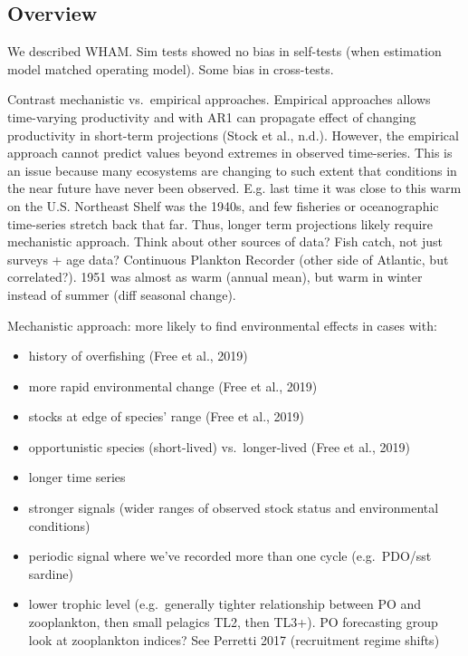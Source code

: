 \documentclass[]{article}
\providecommand{\tightlist}{%
  \setlength{\itemsep}{0pt}\setlength{\parskip}{0pt}}
\begin{document}
\hypertarget{overview}{%
\subsection{Overview}\label{overview}}

We described WHAM. Sim tests showed no bias in self-tests (when
estimation model matched operating model). Some bias in cross-tests.

Contrast mechanistic vs.~empirical approaches. Empirical approaches
allows time-varying productivity and with AR1 can propagate effect of
changing productivity in short-term projections (Stock et al., n.d.).
However, the empirical approach cannot predict values beyond extremes in
observed time-series. This is an issue because many ecosystems are
changing to such extent that conditions in the near future have never
been observed. E.g. last time it was close to this warm on the U.S.
Northeast Shelf was the 1940s, and few fisheries or oceanographic
time-series stretch back that far. Thus, longer term projections likely
require mechanistic approach. Think about other sources of data? Fish
catch, not just surveys + age data? Continuous Plankton Recorder (other
side of Atlantic, but correlated?). 1951 was almost as warm (annual
mean), but warm in winter instead of summer (diff seasonal change).

Mechanistic approach: more likely to find environmental effects in cases
with:

\begin{itemize}
\tightlist
\item
  history of overfishing (Free et al., 2019)
\item
  more rapid environmental change (Free et al., 2019)
\item
  stocks at edge of species' range (Free et al., 2019)
\item
  opportunistic species (short-lived) vs.~longer-lived (Free et al.,
  2019)
\item
  longer time series
\item
  stronger signals (wider ranges of observed stock status and
  environmental conditions)
\item
  periodic signal where we've recorded more than one cycle (e.g.~PDO/sst
  sardine)
\item
  lower trophic level (e.g.~generally tighter relationship between PO
  and zooplankton, then small pelagics TL2, then TL3+). PO forecasting
  group look at zooplankton indices? See Perretti 2017 (recruitment
  regime shifts)
\end{itemize}
\end{document}
